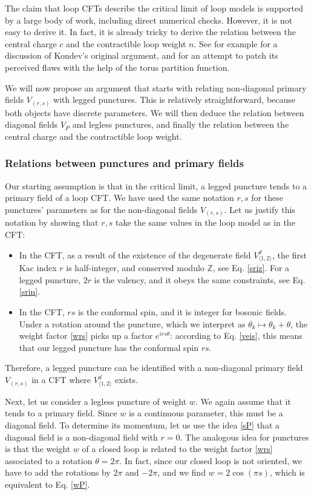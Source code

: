 \documentclass[12pt, a4paper]{article}
\theoremstyle{break}
\begin{document}
The claim that loop CFTs describe the critical limit of loop models is supported by a large body of work, including direct numerical checks. However, it is not easy to derive it. In fact, it is already tricky to derive the relation between the central charge $c$ and the contractible loop weight $n$. See for example \cite[Appendix A]{grz18} for a discussion of Kondev's original argument, and for an attempt to patch its perceived flaws with the help of the torus partition function. 

We will now propose an argument that starts with relating non-diagonal primary fields $V_{(r,s)}$ with legged punctures. This is relatively straightforward, because both objects have discrete parameters. We will then deduce the relation between diagonal fields $V_P$ and legless punctures, and finally the relation between the central charge and the contractible loop weight. 

\subsubsection{Relations between punctures and primary fields}

Our starting assumption is that in the critical limit, a legged puncture tends to a primary field of a loop CFT. We have used the same notation $r,s$ for these punctures' parameters as for the non-diagonal fields $V_{(r,s)}$. Let us justify this notation by showing that $r,s$ take the same values in the loop model as in the CFT:
\begin{itemize}
 \item In the CFT, as a result of the existence of the degenerate field $V^d_{\langle 1,2\rangle}$, the first Kac index $r$ is half-integer, and conserved modulo $\mathbb{Z}$, see Eq. \eqref{sriz}. For a legged puncture, $2r$ is the valency, and it obeys the same constraints, see Eq. \eqref{srin}.
 \item In the CFT, $rs$ is the conformal spin, and it is integer for bosonic fields. Under a rotation around the puncture, which we interpret as $\theta_k\mapsto \theta_k + \theta$, the weight factor \eqref{wrs} picks up a factor $e^{irs\theta}$: according to Eq. \eqref{veis}, this means that our legged puncture has the conformal spin $rs$. 
\end{itemize}
Therefore, a legged puncture can be identified with a non-diagonal primary field $V_{(r,s)}$ in a CFT where $V^d_{\langle 1,2\rangle}$ exists. 

Next, let us consider a legless puncture of weight $w$. We again assume that it tends to a primary field. Since $w$ is a continuous parameter, this must be a diagonal field. To determine its momentum, let us use the idea \eqref{sP} that a diagonal field is a non-diagonal field with $r=0$. The analogous idea for punctures is that the weight $w$ of a closed loop is related to the weight factor \eqref{wrs} associated to a rotation $\theta = 2\pi$. In fact, since our closed loop is not oriented, we have to add the rotations by $2\pi$ and $-2\pi$, and we find $w=2\cos(\pi s)$, which is equivalent to Eq. \eqref{wP}. 
\end{document}
